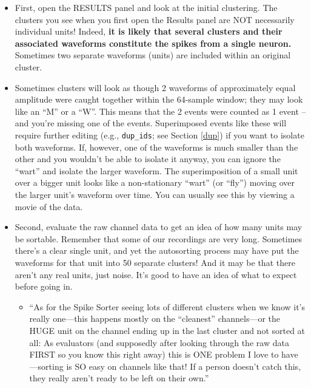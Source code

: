\documentclass[12pt]{article}
\renewcommand{\labelitemii}{$\star$}
\begin{document}
\begin{itemize}
\item First, open the {\sf RESULTS} panel and look at the initial
  clustering. The clusters you see when you first open the Results
  panel are NOT necessarily individual units! Indeed, \textbf{it is
    likely that several clusters and their associated waveforms
    constitute the spikes from a single neuron.} Sometimes two
  separate waveforms (units) are included within an original cluster.
\item Sometimes clusters will look as though 2 waveforms of
  approximately equal amplitude were caught together within the
  64-sample window; they may look like an ``M'' or a ``W''. This means
  that the 2 events were counted as 1 event -- and you're missing one
  of the events. Superimposed events like these will require further
  editing (e.g., {\tt dup\_ids}; see Section \ref{dup}) if you want to
  isolate both waveforms. If, however, one of the waveforms is much
  smaller than the other and you wouldn't be able to isolate it
  anyway, you can ignore the ``wart'' and isolate the larger
  waveform. The superimposition of a small unit over a bigger unit
  looks like a non-stationary ``wart'' (or ``fly'') moving over the
  larger unit's waveform over time. You can usually see this by
  viewing a movie of the data.
\item Second, evaluate the raw channel data to get an idea of how many
  units may be sortable. Remember that some of our recordings are very
  long. Sometimes there's a clear single unit, and yet the autosorting
  process may have put the waveforms for that unit into 50 separate
  clusters! And it may be that there aren't any real units, just
  noise. It's good to have an idea of what to expect before going in.
\begin{itemize}
\renewcommand{\labelitemii}{\ding{226}}
\item ``As for the Spike Sorter seeing lots of different clusters when
  we know it's really one{}---this happens mostly on the ``cleanest''
  channels{}---or the HUGE unit on the channel ending up in the last
  cluster and not sorted at all: As evaluators (and supposedly after
  looking through the raw data FIRST so you know this right away) this
  is ONE problem I love to have{}---sorting is SO easy on channels
  like that! If a person doesn't catch this, they really aren't ready
  to be left on their own.''
\end{itemize}


\end{itemize}
\end{document}
